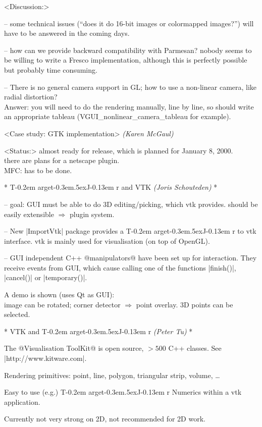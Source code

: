 \documentclass[11pt]{article}
\def\TargetJr{{T\kern-0.2em arget\kern-0.3em\lower.5ex\hbox{\Large J}\kern-0.13em r}}
\def\by#1.{{\normalsize\sf\it(#1)}}\relax
\begin{document}
<Discussion:>

-- some technical issues (``does it do 16-bit images or colormapped images?'')
will have to be answered in the coming days.

-- how can we provide backward compatibility with Parmesan?  nobody seems to be
willing to write a Fresco implementation, although this is perfectly possible
but probably time consuming.

-- There is no general camera support in GL; how to use a non-linear camera,
like radial distortion?
\\ Answer: you will need to do the rendering manually, line by line, so
should write an appropriate tableau (VGUI_nonlinear_camera_tableau for
example).

<Case study: GTK implementation> \by Karen McGaul.


<Status:> almost ready for release, which is planned for January 8, 2000. \\
there are plans for a netscape plugin. \\
MFC: has to be done.


* \TargetJr{} and VTK \by Joris Schouteden. *

-- goal: GUI must be able to do 3D editing/picking, which vtk provides.
         should be easily extensible $\Rightarrow$ plugin system.

-- New |ImportVtk| package provides a \TargetJr{} to vtk interface.
vtk is mainly used for visualisation (on top of OpenGL).

-- GUI independent C++ @manipulators@ have been set up for interaction.
They receive events from GUI, which cause calling one of the functions
|finish()|, |cancel()| or |temporary()|.

A demo is shown (uses Qt as GUI): \\
image can be rotated; corner detector $\Rightarrow$ point overlay.
3D points can be selected.


* VTK and \TargetJr{} \by Peter Tu. *

The @Visualisation ToolKit@ is open source, $ > 500 $ C++ classes.
See |http://www.kitware.com|.

Rendering primitives: point, line, polygon, triangular strip, volume, \ldots

Easy to use (e.g.) \TargetJr{} Numerics within a vtk application.

Currently not very strong on 2D, not recommended for 2D work.
\end{document}
